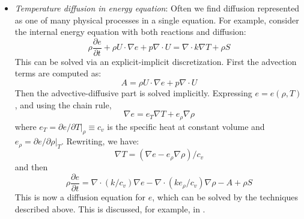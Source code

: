 \begin{itemize}
\item {\em Temperature diffusion in energy equation}: Often we find
 diffusion represented as one of many physical processes in a single
 equation.  For example, consider the internal energy equation with
 both reactions and diffusion:
 \begin{equation}
 \rho\frac{\partial e}{\partial t} + \rho U \cdot \nabla e + p \nabla \cdot U = \nabla \cdot k \nabla T + \rho S
 \end{equation}
 This can be solved via an explicit-implicit discretization.  First
 the advection terms are computed as:
 \begin{equation}
 A = \rho U \cdot \nabla e + p \nabla \cdot U
 \end{equation}
 Then the advective-diffusive part is solved implicitly.  Expressing
 $e = e(\rho, T)$, and using the chain rule,
 \begin{equation}
   \nabla e = e_T \nabla T + e_\rho \nabla \rho
 \end{equation}
 where $e_T = \partial e / \partial T |_\rho \equiv c_v$ is the
 specific heat at constant volume and $e_\rho = \partial e / \partial
 \rho |_T$.  Rewriting, we have:
 \begin{equation}
 \nabla T = (\nabla e - e_\rho \nabla \rho)/c_v
 \end{equation}
  and then
 \begin{equation}
 \rho \frac{\partial e}{\partial t} = \nabla \cdot (k/c_v) \nabla e - \nabla \cdot (k e_\rho/c_v) \nabla \rho -A + \rho S
 \end{equation}
 This is now a diffusion equation for $e$, which can be solved by the
 techniques described above.  This is discussed, for example, in
 \cite{SNpaper,malone:2011}.
\end{itemize}

